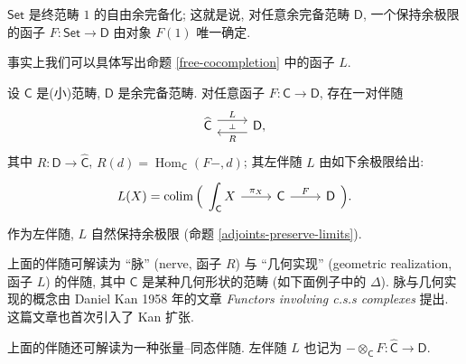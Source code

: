 \begin{example}
    {}
    $\mathsf {Set}$ 是终范畴 $1$ 的自由余完备化;
    这就是说, 对任意余完备范畴 $\mathsf D$,
    一个保持余极限的函子 $F \colon \mathsf {Set}\to \mathsf D$ 由对象 $F(1)$ 唯一确定.
\end{example}

事实上我们可以具体写出命题 \ref{free-cocompletion} 中的函子 $L$.

\begin{prop}
	[label={nerve-and-realization}]
	{}
	设 $\mathsf C$ 是(小)范畴, $\mathsf D$ 是余完备范畴.
	对任意函子 $F \colon \mathsf C \to \mathsf D$, 存在一对伴随
	\[\begin{tikzcd}[ampersand replacement=\&]
		{\widehat {\mathsf C}} \& {\mathsf D,}
		\arrow[""{name=0, anchor=center, inner sep=0}, "L", shift left=2, from=1-1, to=1-2]
		\arrow[""{name=1, anchor=center, inner sep=0}, "R", shift left=2, from=1-2, to=1-1]
		\arrow["\dashv"{anchor=center, rotate=-90}, draw=none, from=0, to=1]
	\end{tikzcd}\]
	其中 $R \colon \mathsf D \to \widehat {\mathsf C}$,
	$R(d) = \operatorname{Hom}_{\mathsf C}(F-,d)$;
	其左伴随 $L$ 由如下余极限给出:
	$$
	L (X) = \operatorname{colim}\Big(\begin{tikzcd}[ampersand replacement=\&]
		{\displaystyle\int_{\mathsf C}X} \& {\mathsf C} \& {\mathsf D}
		\arrow["F", from=1-2, to=1-3]
		\arrow["{\pi_X}", from=1-1, to=1-2]
	\end{tikzcd}\Big).
	$$
	作为左伴随, $L$ 自然保持余极限 (命题 \ref{adjoints-preserve-limits}).
\end{prop}

\begin{remark}
	{}
	上面的伴随可解读为 ``脉'' (nerve, 函子 $R$) 与 ``几何实现'' (geometric realization, 函子 $L$) 的伴随, 其中 $\mathsf C$ 是某种几何形状的范畴 (如下面例子中的 $\Delta$).
	脉与几何实现的概念由 Daniel Kan 1958 年的文章 \emph{Functors involving c.s.s complexes} 提出. 这篇文章也首次引入了 Kan 扩张.
\end{remark}

\begin{remark}
	{}
	上面的伴随还可解读为一种张量--同态伴随. 左伴随 $L$ 也记为 ${-}\otimes_{\mathsf C}F\colon \widehat {\mathsf C}\to\mathsf D$.
\end{remark}

